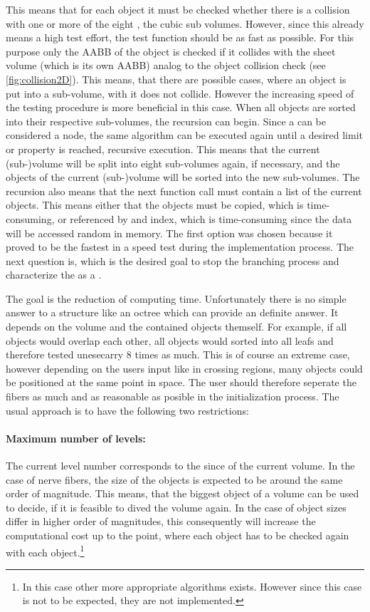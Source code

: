 This means that for each object it must be checked whether there is a collision with one or more of the eight , \ie{} the cubic sub volumes.
However, since this already means a high test effort, the test function should be as fast as possible.
For this purpose only the \ac{AABB} of the object is checked if it collides with the sheet volume (which is its own \ac{AABB}) analog to the object collision check (see \cref{fig:collision2D}).
This means, that there are possible cases, where an object is put into a sub-volume, with it does not collide.
However the increasing speed of the testing procedure is more beneficial in this case.
When all objects are sorted into their respective sub-volumes, the recursion can begin.
Since a  can be considered a node, the same algorithm can be executed again until a desired limit or property is reached, \ie{} recursive execution.
This means that the current (sub-)volume will be split into eight sub-volumes again, if necessary, and the objects of the current (sub-)volume will be sorted into the new sub-volumes.
The recursion also means that the next function call must contain a list of the current objects.
This means either that the objects must be copied, which is time-consuming, or referenced by \eg{} and index, which is time-consuming since the data will be accessed random in memory.
The first option was chosen because it proved to be the fastest in a speed test during the implementation process.
The next question is, which is the desired goal to stop the branching process and characterize the  as a .
\par
%
The goal is the reduction of computing time.
Unfortunately there is no simple answer to a structure like an octree which can provide an definite answer.
It depends on the volume and the contained objects themself.
For example, if all objects would overlap each other, all objects would sorted into all leafs and therefore tested unesecarry 8 times as much.
This is of course an extreme case, however depending on the users input like in crossing regions, many objects could be positioned at the same point in space.
The user should therefore seperate the fibers as much and as reasonable as posible in the initialization process.
The usual approach is to have the following two restrictions:
%
\paragraph{Maximum number of levels:}
The current level number corresponds to the since of the current volume.
In the case of nerve fibers, the size of the objects is expected to be around the same order of magnitude.
This means, that the biggest object of a volume can be used to decide, if it is feasible to dived the volume again.
In the case of object sizes differ in higher order of magnitudes, this consequently will increase the computational cost up to the point, where each object has to be checked again with each object.\footnote{In this case other more appropriate algorithms exists. However since this case is not to be expected, they are not implemented.}
%

